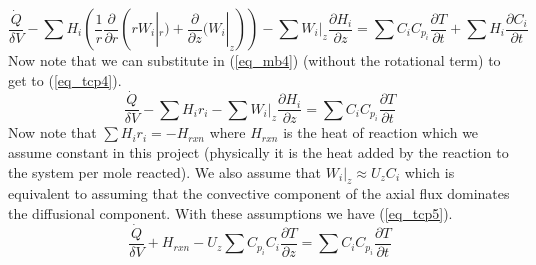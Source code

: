 \documentclass[11pt,fleqn]{article}
\theoremstyle{defstyle}
\begin{document}
\begin{equation}
\frac{\dot{Q}}{\delta V} - \sum H_i (\frac{1}{r}\frac{\partial}{\partial r}(r W_i|_r)+\frac{\partial}{\partial z}(W_i|_z)) - \sum W_i|_z \frac{\partial H_i}{\partial z} =\sum C_i C_{p_i} \frac{\partial T}{\partial t} + \sum H_i \frac{\partial C_i}{\partial t}
\label{eq_tcp3}
\end{equation}
Now note that we can substitute in (\ref{eq_mb4}) (without the rotational term) to get to (\ref{eq_tcp4}).
\begin{equation}
\frac{\dot{Q}}{\delta V} - \sum H_i r_i - \sum W_i|_z \frac{\partial H_i}{\partial z} =\sum C_i C_{p_i} \frac{\partial T}{\partial t}
\label{eq_tcp4}
\end{equation}
Now note that $\sum H_i r_i = -H_{rxn}$ where $H_{rxn}$ is the heat of reaction which we assume constant in this project (physically it is the heat added by the reaction to the system per mole reacted). We also assume that $W_i|_z \approx U_z C_i$ which is equivalent to assuming that the convective component of the axial flux dominates the diffusional component. With these assumptions we have (\ref{eq_tcp5}).
\begin{equation}
\frac{\dot{Q}}{\delta V} + H_{rxn} - U_z\sum C_{p_i}C_i \frac{\partial T}{\partial z} =\sum C_i C_{p_i} \frac{\partial T}{\partial t}
\label{eq_tcp5}
\end{equation}




\newpage


\end{document}
